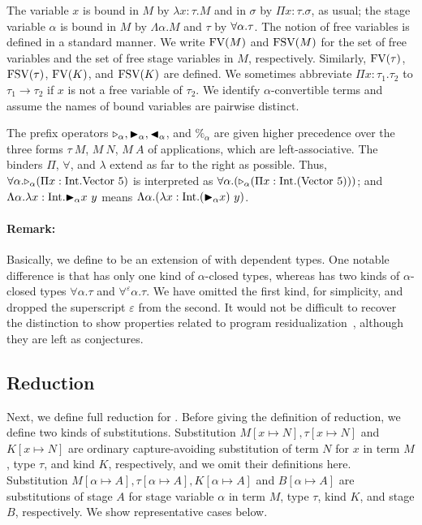 
The variable $x$ is bound in $M$ by $\lambda x:\tau.M$ and in $\sigma$ by $\Pi
x:\tau.\sigma$, as usual; the stage variable $\alpha$ is bound in $M$ by
$\Lambda \alpha.M$ and $\tau$ by $\forall\alpha.\tau$.  The notion of free variables
is defined in a standard manner.  We write $\text{FV}(M)$ and $\text{FSV}(M)$ for the set
of free variables and the set of free stage variables in $M$, respectively.
Similarly, $\text{FV}(\tau)$, $\text{FSV}(\tau)$, $\text{FV}(K)$, and $\text{FSV}(K)$ are defined.  We
sometimes abbreviate $\Pi x:\tau_1.\tau_2$ to $\tau_1 \rightarrow \tau_2$ if
$x$ is not a free variable of $\tau_2$.  We identify $\alpha$-convertible terms
and assume the names of bound variables are pairwise distinct.


The prefix operators ${\mathop{\triangleright}}_\alpha, {\mathop{\blacktriangleright}}_\alpha, {\mathop{\blacktriangleleft}}_\alpha$, and $\%_\alpha$ are
given higher precedence over the three forms $\tau\ M$, $M\ N$, $M\ A$ of
applications, which are left-associative. The binders $\Pi$, $\forall$, and
$\lambda$ extend as far to the right as possible.  Thus, $\forall\alpha.{\mathop{\triangleright}}_{\alpha}
(\Pi x:\textrm{Int}.\text{Vector}\ 5)$ is interpreted as $\forall\alpha.({\mathop{\triangleright}}_{\alpha} (\Pi
x:\textrm{Int}.(\text{Vector}\ 5)))$; and $\Lambda\alpha.\lambda x:\textrm{Int}.{\mathop{\blacktriangleright}}_\alpha x\ y$
means $\Lambda\alpha.(\lambda x:\textrm{Int}.({\mathop{\blacktriangleright}}_\alpha x)\ y)$.


\paragraph{Remark:} Basically, we define \LMD to be an extension of \LTP with
dependent types. One notable difference is that \LMD has only one kind of
\(\alpha\)-closed types, whereas \LTP has two kinds of \(\alpha\)-closed types
\(\forall\alpha.\tau\) and \(\forall^\varepsilon\alpha.\tau\).  We have omitted
the first kind, for simplicity, and dropped the superscript $\varepsilon$ from
the second. It would not be difficult to recover the distinction to show
properties related to program residualization~\cite{HanadaIgarashi2014CSP}, although they
are left as conjectures.

\subsection{Reduction}


Next, we define full reduction for \LMD.  Before giving the definition of
reduction, we define two kinds of substitutions. Substitution $M[x\mapsto N],
\tau[x \mapsto N]$ and $K[x \mapsto N]$ are ordinary capture-avoiding
substitution of term $N$ for $x$ in term $M$, type $\tau$, and kind $K$,
respectively, and we omit their definitions here.  Substitution $M[\alpha
\mapsto A], \tau [\alpha \mapsto A], K[\alpha \mapsto A]$ and $B[\alpha\mapsto
A]$ are substitutions of stage $A$ for stage variable $\alpha$ in term $M$,
type $\tau$, kind $K$, and stage $B$, respectively.  We show representative
cases below.

